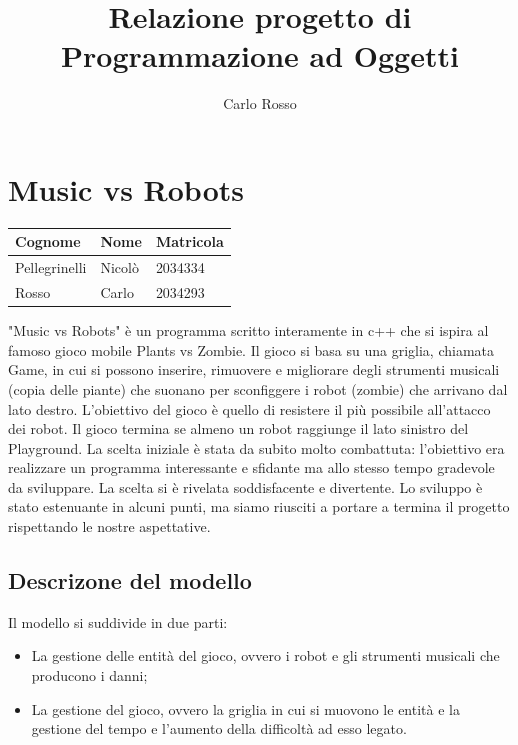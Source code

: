 \documentclass[11pt]{article}
\title{Relazione progetto di Programmazione ad Oggetti}
\author{Carlo Rosso}
\begin{document}
\section{Music vs Robots}

\begin{table}[ht]
	\begin{tabular}{|l|l|l|}
		\hline
		\textbf{Cognome} & \textbf{Nome} & \textbf{Matricola} \\ \hline
		Pellegrinelli & Nicolò & 2034334 \\ \hline
		Rosso & Carlo & 2034293 \\ \hline
	\end{tabular}
\end{table}

"Music vs Robots" è un programma scritto interamente in c++ che si ispira al 
famoso gioco mobile Plants vs Zombie.
Il gioco si basa su una griglia, chiamata Game, in cui si possono 
inserire, rimuovere e migliorare degli strumenti musicali (copia delle piante) 
che suonano per sconfiggere i robot (zombie) che arrivano dal lato destro.
L’obiettivo del gioco è quello di resistere il più possibile all’attacco dei 
robot. Il gioco termina se almeno un robot raggiunge il lato sinistro del 
Playground.
La scelta iniziale è stata da subito molto combattuta: l’obiettivo era 
realizzare un programma interessante e sfidante ma allo stesso tempo gradevole
da sviluppare.
La scelta si è rivelata soddisfacente e divertente. Lo sviluppo è stato
estenuante in alcuni punti, ma siamo riusciti a portare a termina il progetto
rispettando le nostre aspettative.

\subsection{Descrizone del modello}

Il modello si suddivide in due parti:
\begin{itemize}
	\item La gestione delle entità del gioco, ovvero i robot e gli strumenti
		musicali che producono i danni;

	\item La gestione del gioco, ovvero la griglia in cui si muovono le entità
		e la gestione del tempo e l'aumento della difficoltà ad esso legato.
\end{itemize}
\end{document}
